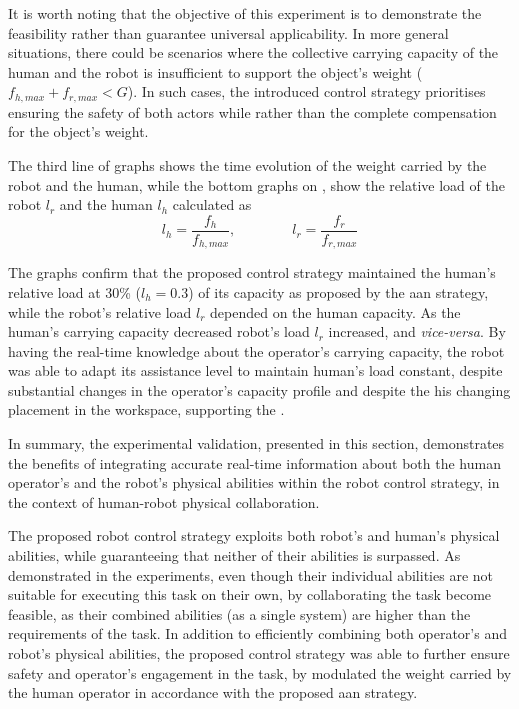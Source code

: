 It is worth noting that the objective of this experiment is to demonstrate the feasibility rather than guarantee universal applicability. In more general situations, there could be scenarios where the collective carrying capacity of the human and the robot is insufficient to support the object's weight ($f_{h,max}+f_{r,max} <G$). In such cases, the introduced control strategy prioritises ensuring the safety of both actors while rather than the complete compensation for the object's weight.

The third line of graphs shows the time evolution of the weight carried by the robot and the human, while the bottom graphs on , show the relative load of the robot $l_r$ and the human $l_h$ calculated as
$$
l_h = \frac{f_h}{f_{h,max}}, \qquad\qquad l_r = \frac{f_r}{f_{r,max}}
$$

The graphs confirm that the proposed control strategy maintained the human's relative load at 30\% ($l_h=0.3$) of its capacity as proposed by the \gls{aan} strategy, while the robot's relative load $l_r$ depended on the human capacity. As the human's carrying capacity decreased robot's load $l_r$ increased, and \textit{vice-versa}. By having the real-time knowledge about the operator's carrying capacity, the robot was able to adapt its assistance level to maintain human's load constant, despite substantial changes in the operator's capacity profile and despite the his changing placement in the workspace, supporting the .

In summary, the experimental validation, presented in this section, demonstrates the benefits of integrating accurate real-time information about both the human operator's and the robot's physical abilities within the robot control strategy, in the context of human-robot physical collaboration.

The proposed robot control strategy exploits both robot's and human's physical abilities, while guaranteeing that neither of their abilities is surpassed. As demonstrated in the experiments, even though their individual abilities are not suitable for executing this task on their own, by collaborating the task become feasible, as their combined abilities (as a single system) are higher than the requirements of the task. In addition to efficiently combining both operator's and robot's physical abilities, the proposed control strategy was able to further ensure safety and operator's engagement in the task, by modulated the weight carried by the human operator in accordance with the proposed \gls{aan} strategy. 

